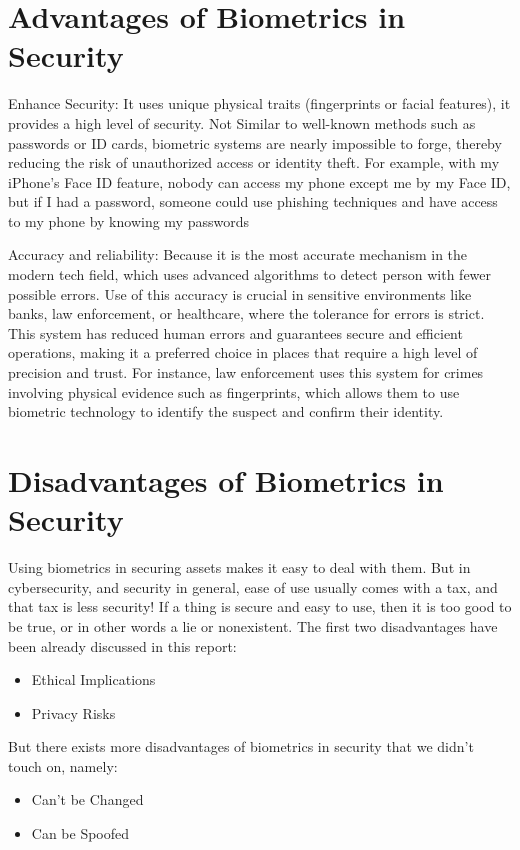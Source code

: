 \documentclass[conference]{IEEEtran}
\begin{document}
\section{Advantages of Biometrics in Security}

Enhance Security: It uses unique physical traits (fingerprints or facial features), it provides a high level of security. Not Similar to well-known methods such as passwords or ID cards, biometric systems are nearly impossible to forge, thereby reducing the risk of unauthorized access or identity theft. For example, with my iPhone's Face ID feature, nobody can access my phone except me by my Face ID, but if I had a password, someone could use phishing techniques and have access to my phone by knowing my passwords

Accuracy and reliability: Because it is the most accurate mechanism in the modern tech field, which uses advanced algorithms to detect person with fewer possible errors. Use of this accuracy is crucial in sensitive environments like banks, law enforcement, or healthcare, where the tolerance for errors is strict. This system has reduced human errors and guarantees secure and efficient operations, making it a preferred choice in places that require a high level of precision and trust. For instance, law enforcement uses this system for crimes involving physical evidence such as fingerprints, which allows them to use biometric technology to identify the suspect and confirm their identity.

\section{Disadvantages of Biometrics in Security}

Using biometrics in securing assets makes it easy to deal with them. But in cybersecurity, and security in general, ease of use usually comes with a tax, and that tax is less security! If a thing is secure and easy to use, then it is too good to be true, or in other words a lie or nonexistent. The first two disadvantages have been already discussed in this report:
\begin{itemize}
    \item Ethical Implications
    \item Privacy Risks
\end{itemize}

But there exists more disadvantages of biometrics in security that we didn't touch on, namely:
\begin{itemize}
    \item Can't be Changed
    \item Can be Spoofed
\end{itemize}
\end{document}

